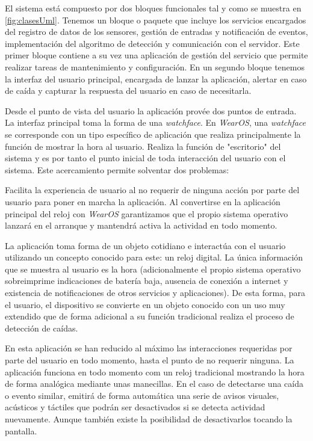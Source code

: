 El sistema está compuesto por dos bloques funcionales tal y como se muestra en \ref{fig:clasesUml}. Tenemos un bloque o paquete que incluye los servicios encargados del registro de datos de los sensores, gestión de entradas y notificación de eventos, implementación del algoritmo de detección y comunicación con el servidor. Este primer bloque contiene a su vez una aplicación de gestión del servicio que permite realizar tareas de mantenimiento y configuración. En un segundo bloque tenemos la interfaz del usuario principal, encargada de lanzar la aplicación, alertar en caso de caída y capturar la respuesta del usuario en caso de necesitarla.


Desde el punto de vista del usuario la aplicación provée dos puntos de entrada. La interfaz principal toma la forma de una \textit{watchface}. En \textit{WearOS}, una \textit{watchface} se corresponde con un tipo específico de aplicación que realiza principalmente la función de mostrar la hora al usuario. Realiza la función de "escritorio" del sistema y es por tanto el punto inicial de toda interacción del usuario con el sistema. Este acercamiento permite solventar dos problemas:

Facilita la experiencia de usuario al no requerir de ninguna acción por parte del usuario para poner en marcha la aplicación. Al convertirse en la aplicación principal del reloj con  \textit{WearOS} garantizamos que el propio sistema operativo lanzará en el arranque y mantendrá activa la actividad en todo momento.

La aplicación toma forma de un objeto cotidiano e interactúa con el usuario utilizando un concepto conocido para este: un reloj digital. La única información que se muestra al usuario es la hora (adicionalmente el propio sistema operativo sobreimprime indicaciones de batería baja, ausencia de conexión a internet y existencia de notificaciones de otros servicios y aplicaciones). De esta forma, para el usuario, el dispositivo se convierte en un objeto conocido con un uso muy extendido que de forma adicional a su función tradicional realiza el proceso de detección de caídas.

En esta aplicación se han reducido al máximo las interacciones requeridas por parte del usuario en todo momento, hasta el punto de no requerir ninguna. La aplicación funciona en todo momento com un reloj tradicional mostrando la hora de forma analógica mediante unas manecillas. En el caso de detectarse una caída o evento similar, emitirá de forma automática una serie de avisos visuales, acústicos y táctiles que podrán ser desactivados si se detecta actividad nuevamente. Aunque también existe la posibilidad de desactivarlos tocando la pantalla.

